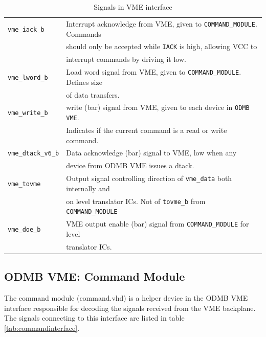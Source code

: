 \documentclass[10pt,a4paper]{article}
\begin{document}
\begin{table}[H]
\begin{tabular}{|l|l|}
\texttt{vme\_iack\_b}& Interrupt acknowledge from VME, given to \texttt{COMMAND\_MODULE}. Commands \\
                     & should only be accepted while \texttt{IACK} is high, allowing VCC to \\
										 & interrupt commands by driving it low.\\ \hline
\texttt{vme\_lword\_b}& Load word signal from VME, given to \texttt{COMMAND\_MODULE}. Defines size \\ 
                      & of data transfers.\\ \hline
\texttt{vme\_write\_b}& write (bar) signal from VME, given to each device in \texttt{ODMB VME}. \\
                      & Indicates if the current command is a read or write command.\\ \hline
\texttt{vme\_dtack\_v6\_b}& Data acknowledge (bar) signal to VME, low when any \\
                 & device from ODMB VME issues a dtack.\\ \hline \hline
\texttt{vme\_tovme}& Output signal controlling direction of \texttt{vme\_data} both internally and \\
          & on level translator ICs. Not of \texttt{tovme\_b} from \texttt{COMMAND\_MODULE}\\ \hline
\texttt{vme\_doe\_b}& VME output enable (bar) signal from \texttt{COMMAND\_MODULE} for level \\
                    & translator ICs.\\ \hline
\end{tabular}
\caption{Signals in VME interface}
\label{tab:odmbvme}
\end{table}

\subsection{ODMB VME: Command Module}

The command module (command.vhd) is a helper device in the ODMB VME interface responsible for decoding the signals received from the VME backplane. The signals connecting to this interface are listed in table \ref{tab:commandinterface}.
\end{document}
